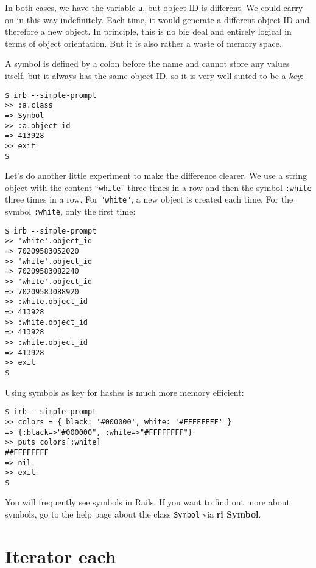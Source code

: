 \documentclass[a4paper]{book}
\begin{document}
In both cases, we have the variable \texttt{a}, but object ID is different. We could carry on in this way indefinitely. Each time, it would generate a different object ID and therefore a new object. In principle, this is no big deal and entirely logical in terms of object orientation. But it is also rather a waste of memory space.

A symbol is defined by a colon before the name and cannot store any values itself, but it always has the same object ID, so it is very well suited to be a \emph{key}:

\begin{shaded}\begin{verbatim}
$ irb --simple-prompt
>> :a.class
=> Symbol
>> :a.object_id
=> 413928
>> exit
$
\end{verbatim}\end{shaded}

Let's do another little experiment to make the difference clearer. We use a string object with the content “\texttt{white}” three times in a row and then the symbol \texttt{:white} three times in a row. For \texttt{"white"}, a new object is created each time. For the symbol \texttt{:white}, only the first time:

\begin{shaded}\begin{verbatim}
$ irb --simple-prompt
>> 'white'.object_id
=> 70209583052020
>> 'white'.object_id
=> 70209583082240
>> 'white'.object_id
=> 70209583088920
>> :white.object_id
=> 413928
>> :white.object_id
=> 413928
>> :white.object_id
=> 413928
>> exit
$
\end{verbatim}\end{shaded}

Using symbols as key for hashes is much more memory efficient:

\begin{shaded}\begin{verbatim}
$ irb --simple-prompt
>> colors = { black: '#000000', white: '#FFFFFFFF' }
=> {:black=>"#000000", :white=>"#FFFFFFFF"}
>> puts colors[:white]
##FFFFFFFF
=> nil
>> exit
$
\end{verbatim}\end{shaded}

You will frequently see symbols in Rails. If you want to find out more about symbols, go to the help page about the class \texttt{Symbol} via \textbf{ri Symbol}.

\section{Iterator each}\label{iterator-each-1}
\end{document}
